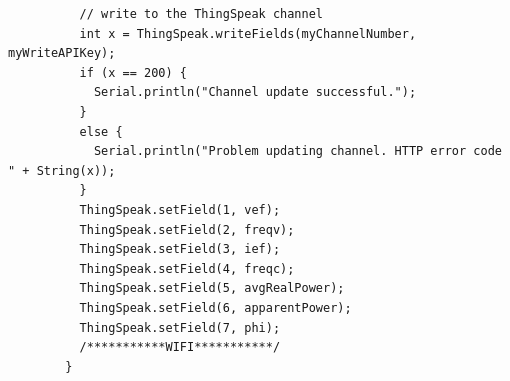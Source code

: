 \documentclass[12pt]{article}
\begin{document}
\begin{lstlisting}
          // write to the ThingSpeak channel
          int x = ThingSpeak.writeFields(myChannelNumber, myWriteAPIKey);
          if (x == 200) {
            Serial.println("Channel update successful.");
          }
          else {
            Serial.println("Problem updating channel. HTTP error code " + String(x));
          }
          ThingSpeak.setField(1, vef);
          ThingSpeak.setField(2, freqv);
          ThingSpeak.setField(3, ief);
          ThingSpeak.setField(4, freqc);
          ThingSpeak.setField(5, avgRealPower);
          ThingSpeak.setField(6, apparentPower);
          ThingSpeak.setField(7, phi);
          /***********WIFI***********/
        }
        
    \end{lstlisting}
\end{document}
